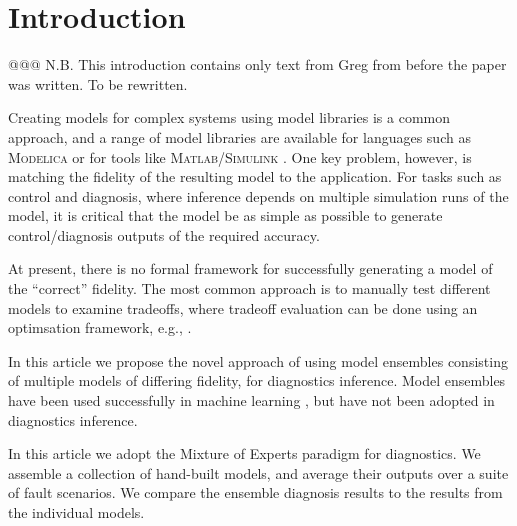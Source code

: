 \section{Introduction}
%
@@@ N.B. This introduction contains only text from Greg from before the paper was written. To be rewritten.
\par
Creating models for complex systems using model libraries is a common
approach, and a range of model libraries are available for languages
such as \textsc{Modelica} \citep{?} or for tools like
\textsc{Matlab}/\textsc{Simulink} \citep{?}. One key problem, however,
is matching the fidelity of the resulting model to the application.
For tasks such as control and diagnosis, where inference depends on
multiple simulation runs of the model, it is critical that the model
be as simple as possible to generate control/diagnosis outputs of the
required accuracy.
\par
At present, there is no formal framework for successfully generating a
model of the ``correct'' fidelity. The most common approach is to
manually test different models to examine tradeoffs, where tradeoff
evaluation can be done using an optimsation framework, e.g.,
\citep{wetter2001genopt}.
\par
In this article we propose the novel approach of using model ensembles
consisting of multiple models of differing fidelity, for diagnostics
inference. Model ensembles have been used successfully in machine
learning \citep{brown2010ensemble,dietterich2000ensemble}, but have
not been adopted in diagnostics inference.
\par
In this article we adopt the Mixture of Experts paradigm
\citep{brown2010ensemble} for diagnostics. We assemble a collection of
hand-built models, and average their outputs over a suite of fault
scenarios. We compare the ensemble diagnosis results to the results
from the individual models.

